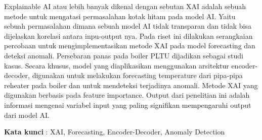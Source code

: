 \begin{spacing}{1}
	
Explainable AI atau lebih banyak dikenal dengan sebutan XAI adalah sebuah metode untuk mengatasi permasalahan kotak hitam pada model AI. Yaitu sebuah permasalahan dimana sebuah model AI tidak transparan dan tidak bisa dijelaskan korelasi antara inpu-output nya. Pada riset ini dilakukan serangkaian percobaan untuk mengimplementasikan metode XAI pada model forecasting dan deteksi anomali. Persebaran panas pada boiler PLTU dijadikan sebagai studi kasus. Secara khusus, model yang diaplikasikan menggunakan arsitektur encoder-decoder, digunakan untuk melakukan forecasting temperature dari pipa-pipa reheater pada boiler dan untuk mendeteksi terjadinya anomali. Metode XAI yang digunakan berbasis pada feature importance. Output dari penelitian ini adalah informasi mengenai variabel input yang paling signifikan mempengaruhi output dari model AI.

\vspace{2ex}
\textbf{Kata kunci }: XAI, Forecasting, Encoder-Decoder, Anomaly Detection
	
\end{spacing}